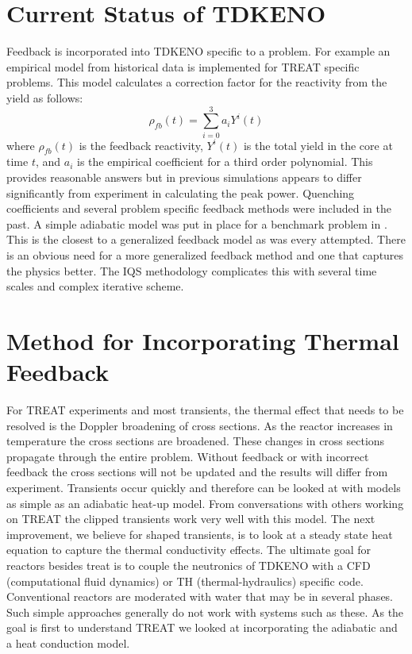 \documentclass[11pt]{article}
\begin{document}
\section{Current Status of TDKENO}
Feedback is incorporated into TDKENO specific to a problem.  For example an empirical model from historical data is implemented for TREAT specific problems. This model calculates a correction factor for the reactivity from the yield as follows:
\begin{equation}
    \rho_{fb}(t) = \sum_{i = 0}^{3}a_i Y^i (t)
\end{equation}
where $\rho_{fb}(t)$ is the feedback reactivity, $Y^i (t)$ is the total yield in the core at time $t$, and $a_i$ is the empirical coefficient for a third order polynomial.
  This provides reasonable answers but in previous simulations appears to differ significantly from experiment in calculating the peak power.
Quenching coefficients and several problem specific feedback methods were included in the past.  A simple adiabatic model was put in place for a benchmark problem in \cite{Bentley}.  This is the closest to a generalized feedback model as was every attempted.  There is an obvious need for a more generalized feedback method and one that captures the physics better.  The IQS methodology complicates this with several time scales and complex iterative scheme.  

\section{Method for Incorporating Thermal Feedback}

For TREAT experiments and most transients, the thermal effect that needs to be resolved is the Doppler broadening of cross sections.  As the reactor increases in temperature the cross sections are broadened.  These changes in cross sections propagate through the entire problem.  Without feedback or with incorrect feedback the cross sections will not be updated and the results will differ from experiment.  Transients occur quickly and therefore can be looked at with models as simple as an adiabatic heat-up model.  From conversations with others working on TREAT the clipped transients work very well with this model.  The next improvement, we believe for shaped transients, is to look at a steady state heat equation to capture the thermal conductivity effects.  The ultimate goal for reactors besides treat is to couple the neutronics of TDKENO with a CFD (computational fluid dynamics) or TH (thermal-hydraulics) specific code.  Conventional reactors are moderated with water that may be in several phases.  Such simple approaches generally do not work with systems such as these.  As the goal is first to understand TREAT we looked at incorporating the adiabatic and a heat conduction model.
\end{document}
